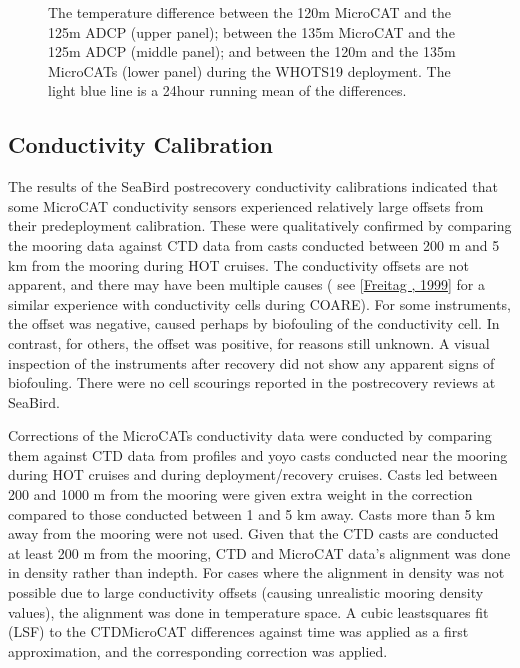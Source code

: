 \documentclass[a4paper,10pt,english,openany,oneside]{sphinxmanual}
\let\sphinxpxdimen\pdfpxdimen\else\newdimen\sphinxpxdimen
\begin{document}
\begin{figure}[htbp]
\centering
\capstart

\noindent\sphinxincludegraphics[height=1000\sphinxpxdimen]{{w19tcompare_5}.png}
\caption{The temperature difference between the 120\sphinxhyphen{}m MicroCAT and the 125\sphinxhyphen{}m ADCP (upper
panel); between the 135\sphinxhyphen{}m MicroCAT and the 125\sphinxhyphen{}m ADCP (middle panel); and
between the 120\sphinxhyphen{}m and the 135\sphinxhyphen{}m MicroCATs (lower panel) during the WHOTS\sphinxhyphen{}19
deployment. The light blue line is a 24\sphinxhyphen{}hour running mean of the differences.}\label{\detokenize{5_section:figure5-6}}\end{figure}


\subsection{Conductivity Calibration}
\label{\detokenize{5_section:conductivity-calibration}}
\sphinxAtStartPar
The results of the Sea\sphinxhyphen{}Bird post\sphinxhyphen{}recovery conductivity calibrations indicated
that some MicroCAT conductivity sensors experienced relatively large offsets
from their pre\sphinxhyphen{}deployment calibration. These were qualitatively confirmed by
comparing the mooring data against CTD data from casts conducted between 200 m
and 5 km from the mooring during HOT cruises. The conductivity offsets are not
apparent, and there may have been multiple causes ( see {[}\hyperlink{cite.references:id4}{Freitag , 1999}{]}
for a similar experience with conductivity cells during COARE). For some
instruments, the offset was negative, caused perhaps by biofouling of the
conductivity cell. In contrast, for others, the offset was positive, for
reasons still unknown. A visual
inspection of the instruments after recovery did not show any apparent signs of
biofouling. There were no cell scourings reported in the post\sphinxhyphen{}recovery reviews
at Sea\sphinxhyphen{}Bird.

\sphinxAtStartPar
Corrections of the MicroCATs conductivity data were conducted by comparing them
against CTD data from profiles and yo\sphinxhyphen{}yo casts conducted near the mooring
during HOT cruises and during deployment/recovery cruises. Casts led between
200 and 1000 m from the mooring were given extra weight in the correction
compared to those conducted between 1 and 5 km away. Casts more than 5 km away
from the mooring were not used. Given that the CTD casts are conducted at least
200 m from the mooring, CTD and MicroCAT data’s alignment was done in density
rather than in\sphinxhyphen{}depth. For cases where the alignment in density was not possible
due to large conductivity offsets (causing unrealistic mooring density values),
the alignment was done in temperature space. A cubic least\sphinxhyphen{}squares fit (LSF) to
the CTD\sphinxhyphen{}MicroCAT differences against time was applied as a first approximation,
and the corresponding correction was applied.
\end{document}

